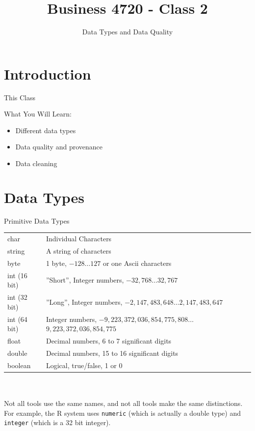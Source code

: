 \documentclass[ignorenonframetext,xcolor=x11names]{beamer}
\title{Business 4720 - Class 2}
\subtitle{Data Types and Data Quality}
\begin{document}
\begin{frame}[label=full]{}
  \titlepage
  \footnotesize
  
\end{frame}

\section{Introduction}

\begin{frame}[label=full]{This Class}

\begin{block}{What You Will Learn:}
\begin{itemize}
  \item Different data types
  \item Data quality and provenance
  \item Data cleaning
\end{itemize}
\end{block}
\end{frame}

\section{Data Types}

\begin{frame}[label=full]{Primitive Data Types}
\small
\renewcommand{\arraystretch}{1.25}

\begin{tabularx}{\textwidth}{l|X} \hline
char 			& Individual Characters\\
string			& A string of characters\\
byte			& 1 byte, $-128 \ldots 127$ or one Ascii characters \\
int (16 bit)	& ''Short'', Integer numbers, $-32,768 \ldots 32,767$ \\ 
int (32 bit)	& ''Long'', Integer numbers, $-2,147,483,648 \ldots 2,147,483,647$ \\
int (64 bit)	& Integer numbers, $-9,223,372,036,854,775,808 \ldots$ $9,223,372,036,854,775$ \\
float			& Decimal numbers, 6 to 7 significant digits \\
double			& Decimal numbers, 15 to 16 significant digits \\
boolean			& Logical, true/false, 1 or 0 \\ \hline
\end{tabularx} \\
\vspace{5mm} \\
Not all tools use the same names, and not all tools make the same distinctions. For example, the R system uses \texttt{numeric} (which is actually a double type) and \texttt{integer} (which is a 32 bit integer).
\end{frame}
\end{document}

